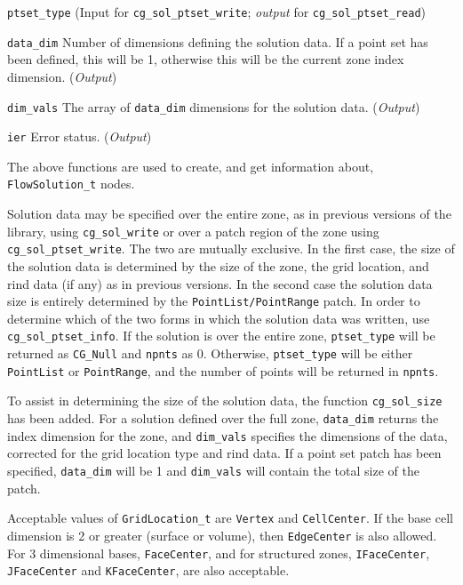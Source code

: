 \begin{Ventryi}{\texttt{ptset\_type}}
      (\textcolor{input}{Input} for \texttt{cg\_sol\_ptset\_write};
      \textcolor{output}{\textit{output}} for
      \texttt{cg\_sol\_ptset\_read})
\item [\texttt{data\_dim}]
      Number of dimensions defining the solution data.
      If a point set has been defined, this will be 1,
      otherwise this will be the current zone index dimension.
      (\textcolor{output}{\textit{Output}})
\item [\texttt{dim\_vals}]
      The array of \texttt{data\_dim} dimensions for the solution data.
      (\textcolor{output}{\textit{Output}})
\item [\texttt{ier}]
      Error status.
      (\textcolor{output}{\textit{Output}})
\end{Ventryi}

The above functions are used to create, and get information about,
\texttt{FlowSolution\_t} nodes.

Solution data may be specified over the entire zone, as in previous
versions of the library, using \texttt{cg\_sol\_write} or over
a patch region of the zone using \texttt{cg\_sol\_ptset\_write}.
The two are mutually exclusive. In the first case, the size of
the solution data is determined by the size of the zone, the
grid location, and rind data (if any) as in previous versions.
In the second case the solution data size is entirely determined
by the \texttt{PointList/PointRange} patch. In order to determine which of
the two forms in which the solution data was written, use
\texttt{cg\_sol\_ptset\_info}. If the solution is over the entire
zone, \texttt{ptset\_type} will be returned as \texttt{CG\_Null}
and \texttt{npnts} as 0. Otherwise, \texttt{ptset\_type} will
be either \texttt{PointList} or \texttt{PointRange}, and the
number of points will be returned in \texttt{npnts}.

To assist in determining the size of the solution data,
the function \texttt{cg\_sol\_size} has been added. For a solution
defined over the full zone, \texttt{data\_dim} returns the index
dimension for the zone, and \texttt{dim\_vals} specifies the
dimensions of the data, corrected for the grid location type
and rind data. If a point set patch has been specified,
\texttt{data\_dim} will be 1 and \texttt{dim\_vals} will contain
the total size of the patch.

Acceptable values of \texttt{GridLocation\_t} are \texttt{Vertex}
and \texttt{CellCenter}. If the base cell dimension is 2 or
greater (surface or volume), then \texttt{EdgeCenter} is
also allowed. For 3 dimensional bases, \texttt{FaceCenter}, and
for structured zones, \texttt{IFaceCenter}, \texttt{JFaceCenter}
and \texttt{KFaceCenter}, are also acceptable.

